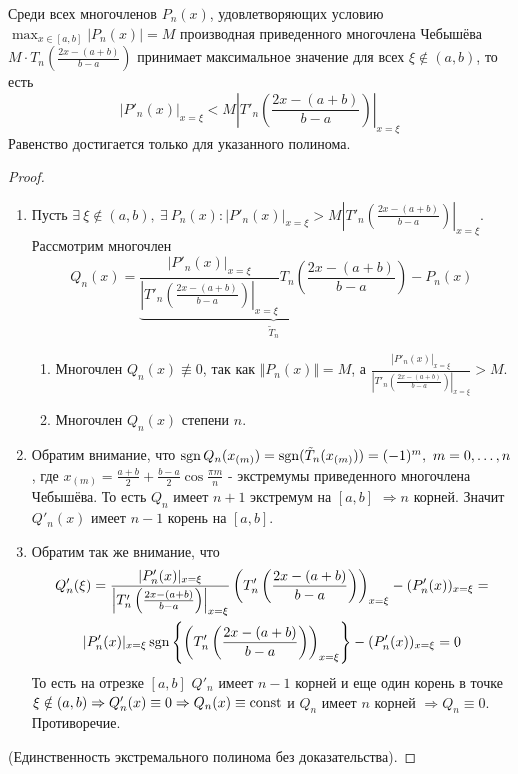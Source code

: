 \begin{theorem}[Марков А.А]
  Среди всех многочленов $P_n(x)$, удовлетворяющих условию $\max_{x\in[a,b]}|P_n(x)|=M$
  производная приведенного многочлена Чебышёва $M\cdot T_n\left(\frac{2x-(a+b)}{b-a}\right)$ принимает максимальное значение
  для всех $\xi\notin(a,b)$, то есть
  \[|P'_n(x)|_{x=\xi}<M\left|T'_n\left(\frac{2x-(a+b)}{b-a}\right)\right|_{x=\xi}\]
  Равенство достигается только для указанного полинома.
\end{theorem}
\begin{proof}
  \begin{enumerate}
    \item Пусть $\exists\ \xi\notin(a,b),\ \exists\ P_n(x): |P'_n(x)|_{x=\xi}>M\left|T'_n\left(\frac{2x-(a+b)}{b-a}\right)\right|_{x=\xi}$. Рассмотрим многочлен
          \[Q_n(x)=\underbrace{\frac{|P'_n(x)|_{x=\xi}}{\left|T'_n\left(\frac{2x-(a+b)}{b-a}\right)\right|_{x=\xi}}T_n\left(\frac{2x-(a+b)}{b-a}\right)}_{\tilde{T}_n} - P_n(x)\]
          \begin{enumerate}
            \item Многочлен $Q_n(x)\not\equiv0$, так как $\Vert P_n(x)\Vert=M$, а $\frac{|P'_n(x)|_{x=\xi}}{\left|T'_n\left(\frac{2x-(a+b)}{b-a}\right)\right|_{x=\xi}}>M$.
            \item Многочлен $Q_n(x)$ степени $n$.
          \end{enumerate}
    \item Обратим внимание, что $\operatorname{sgn} Q_n(x_{(m)})=\operatorname{sgn}(\tilde{T}_n(x_{(m)}))=(-1)^m,\ m=0,\ldots,n$, где $x_{(m)}=\frac{a+b}{2}+\frac{b-a}{2}\cos\frac{\pi m}{n}$
          - экстремумы приведенного многочлена Чебышёва. То есть $Q_n$ имеет $n+1$ экстремум на $[a,b]$ $\Rightarrow n$ корней. Значит $Q'_n(x)$ имеет $n-1$ корень на $[a,b]$.
    \item Обратим так же внимание, что
          \begin{multline*}
            Q'_n(\xi)=\frac{|P'_n(x)|_{x=\xi}}{\left|T'_n\left(\frac{2x-(a+b)}{b-a}\right)\right|_{x=\xi}}\left(T'_n\left(\frac{2x-(a+b)}{b-a}\right)\right)_{x=\xi} - (P'_n(x))_{x=\xi}=\\
            |P'_n(x)|_{x=\xi}\operatorname{sgn}\left\{\left(T'_n\left(\frac{2x-(a+b)}{b-a}\right)\right)_{x=\xi}\right\} - (P'_n(x))_{x=\xi}=0
          \end{multline*}
          То есть на отрезке $[a,b]$
          $Q'_n$ имеет $n-1$ корней и еще один корень
          в точке $\xi\notin(a,b)\Rightarrow Q'_n(x)\equiv0\Rightarrow Q_n(x)\equiv\mathrm{const}$ и $Q_n$ имеет $n$ корней $\Rightarrow Q_n\equiv0$. Противоречие.
  \end{enumerate}
  (Единственность экстремального полинома без доказательства).
\end{proof}
